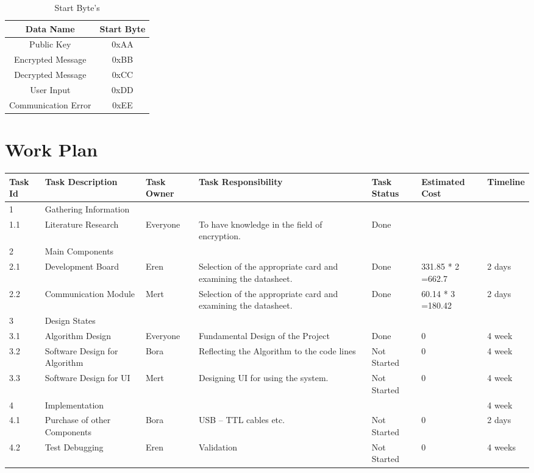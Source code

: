 \documentclass[12pt]{article}
\begin{document}
 \begin{table}[H]	
 	\centering
 	\begin{tabular}{|c|c|}
 		\hline
 		Data Name & Start Byte  \\
 		\hline
 		Public Key &  0xAA \\ \hline
 		Encrypted Message &  0xBB \\ \hline
 		Decrypted Message &  0xCC  \\ \hline
 		User Input & 0xDD  \\ \hline
 		Communication Error &  0xEE \\ \hline
 	\end{tabular}
	\caption{Start Byte's} 
\end{table}
 	\newpage
 	\section{Work Plan}
 	\renewcommand{\arraystretch}{2}
 
 		\renewcommand{\arraystretch}{1}
 	\centering
 		\begin{longtable}{|p{1cm}|p{2cm}|p{1.6cm}|p{2cm}|p{2cm}|p{2cm}|p{2cm}|}
 		
 			\hline
 			Task Id & Task Description & Task Owner & Task  Responsibility & Task Status & Estimated Cost & Timeline \\
 			\hline
 			1 & Gathering Information &  &  &  & &  \\ 	\hline
 			1.1 & Literature Research & Everyone & To have knowledge in the field of encryption. & Done &  &  \\ 	\hline
 			2 & Main Components &  &  &  &  &  \\ 	\hline
 			2.1 & Development Board & Eren & Selection of the appropriate card and  examining the datasheet.& Done & 331.85 * 2 =662.7  & 2 days \\ 	\hline
 			2.2 & Communication Module & Mert & Selection of the appropriate card and  examining the datasheet.  & Done  & 60.14 * 3 =180.42  & 2 days  \\ 	\hline
 			3 & Design States &  &  &  &  &  \\ 	\hline
 			3.1 & Algorithm Design & Everyone & Fundamental Design of the Project  & Done  & 0  & 4 week  \\ 	\hline
 			3.2 & Software Design for Algorithm & Bora  & Reflecting the Algorithm to the code lines  & Not Started  & 0 & 4 week\\ 	\hline
 			3.3& Software Design for UI & Mert  & Designing UI for using the system. & Not Started  & 0  & 4 week \\ 	\hline
 			4 & Implementation &   &  &   &   & 4 week \\ 	\hline
 			4.1 & Purchase of other Components & Bora  & USB – TTL cables etc.  & Not Started  & 0 & 2 days  \\ 	\hline
 			4.2 & Test Debugging& Eren  & Validation  & Not Started  & 0  & 4 weeks  \\
 			\hline
 		\end{longtable}
 	
\end{document}
